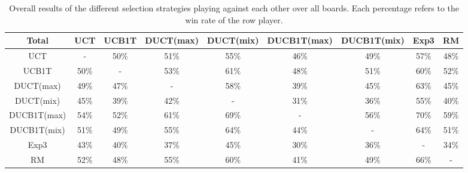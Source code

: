 \documentclass{article}
\begin{document}
\begin{table}[h!]\scriptsize
\centering
\begin{tabular}{|c||c|c|c|c|c|c|c|c|}
									\hline
  Total 	     	& UCT 	& UCB1T		& DUCT(max)	& DUCT(mix)	& DUCB1T(max)	& DUCB1T(mix)	& Exp3	& RM				\\ 	
  \hline
  \hline
   UCT &    - & 50\% & 51\% & 55\% & 46\% & 49\% & 57\% & 48\% \\ \hline 
 UCB1T & 50\% &    - & 53\% & 61\% & 48\% & 51\% & 60\% & 52\% \\ \hline 
   DUCT(max) & 49\% & 47\% &    - & 58\% & 39\% & 45\% & 63\% & 45\% \\ \hline 
   DUCT(mix) & 45\% & 39\% & 42\% &    - & 31\% & 36\% & 55\% & 40\% \\ \hline 
 DUCB1T(max) & 54\% & 52\% & 61\% & 69\% &    - & 56\% & 70\% & 59\% \\ \hline 
 DUCB1T(mix) & 51\% & 49\% & 55\% & 64\% & 44\% &    - & 64\% & 51\% \\ \hline 
      Exp3 & 43\% & 40\% & 37\% & 45\% & 30\% & 36\% &    - & 34\% \\ \hline 
        RM & 52\% & 48\% & 55\% & 60\% & 41\% & 49\% & 66\% &    - \\ \hline 
\end{tabular}
\caption{Overall results of the different selection strategies playing against each other over all boards.
Each percentage refers to the win rate of the row player. }
\label{table:round_robin_total}
\end{table}
\end{document}
